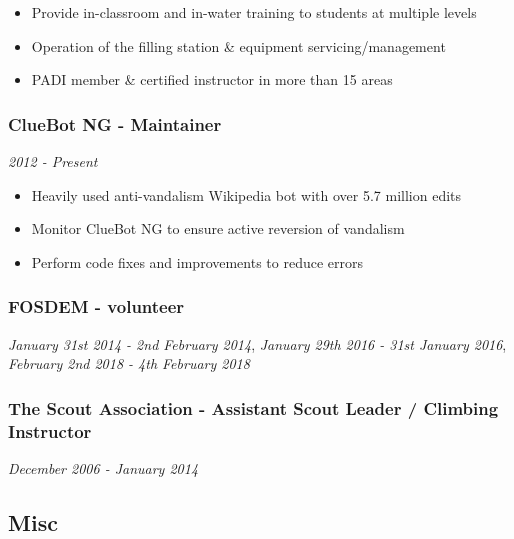 \begin{itemize}
\tightlist
\item
  Provide in-classroom and in-water training to students at multiple
  levels
\item
  Operation of the filling station \& equipment servicing/management
\item
  PADI member \& certified instructor in more than 15 areas
\end{itemize}

\hypertarget{cluebot-ng---maintainer}{%
\subsubsection{ClueBot NG - Maintainer}\label{cluebot-ng---maintainer}}

\emph{2012 - Present}

\begin{itemize}
\tightlist
\item
  Heavily used anti-vandalism Wikipedia bot with over 5.7 million edits
\item
  Monitor ClueBot NG to ensure active reversion of vandalism
\item
  Perform code fixes and improvements to reduce errors
\end{itemize}

\hypertarget{fosdem---volunteer}{%
\subsubsection{FOSDEM - volunteer}\label{fosdem---volunteer}}

\emph{January 31st 2014 - 2nd February 2014}, \emph{January 29th 2016 -
31st January 2016}, \emph{February 2nd 2018 - 4th February 2018}

\hypertarget{the-scout-association---assistant-scout-leader-climbing-instructor}{%
\subsubsection{The Scout Association - Assistant Scout Leader / Climbing
Instructor}\label{the-scout-association---assistant-scout-leader-climbing-instructor}}

\emph{December 2006 - January 2014}

\hypertarget{misc}{%
\subsection{Misc}\label{misc}}

